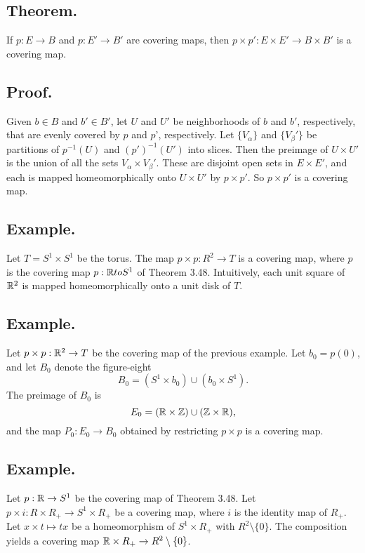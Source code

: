 \documentclass[titlepage]{article}
\begin{document}
\subsection{Theorem.} If $p: E \to B$ and $p: E' \to B'$ are covering maps, then 
$p \times p': E \times E' \to B \times B'$ is a covering map.

\subsection{Proof.} Given $b \in B$ and $b' \in B'$, let $U$ and $U'$ be neighborhoods of $b$ and $b'$, respectively, that are evenly covered by $p$ and $p$', respectively. Let $\{V_{\alpha}\}$ and $\{V_{\beta}'\}$ be partitions of $p^{-1}(U)$ and $(p')^{-1}(U')$ into slices. Then the preimage of $U \times U'$ is the union of all the sets $V_{\alpha} \times V_{\beta}'$. These are disjoint open sets in $E \times E'$, and each is mapped homeomorphically onto $U \times U'$ by $p \times p'$. So $p \times p'$ is a covering map.

\subsection{Example.} Let $T = S^{1} \times S^{1}$ be the torus. The map $p \times p: R^{2} \to T$ is a covering map, where $p$ is the covering map $p: \mathbb{R} to S^{1}$ of Theorem 3.48. Intuitively, each unit square of $\mathbb{R}^{2}$ is mapped homeomorphically onto a unit disk of $T$.

\subsection{Example.} Let $p \times p: \mathbb{R}^{2} \to T$ be the covering map of the previous example. Let $b_{0} = p(0)$, and let $B_{0}$ denote the figure-eight 
$$B_{0} = (S^{1} \times b_{0}) \cup (b_{0} \times S^{1}).$$
The preimage of $B_{0}$ is 
$$E_{0} = (\mathbb{R} \times \mathbb{Z}) \cup (\mathbb{Z} \times \mathbb{R}),$$
and the map $P_{0}: E_{0} \to B_{0}$ obtained by restricting $p \times p$ is a covering map.

\subsection{Example.} Let $p: \mathbb{R} \to S^{1}$ be the covering map of Theorem 3.48. Let $p \times i: R \times R_{+} \to S^{1} \times R_{+}$ be a covering map, where $i$ is the identity map of $R_{+}$. Let $x \times t \mapsto tx$ be a homeomorphism of $S^{1} \times R_{+}$ with $R^{2} \setminus \{0\}$. The composition yields a covering map $\mathbb{R} \times R_{+} \to R^{2} \setminus \{0\}$.
\end{document}
